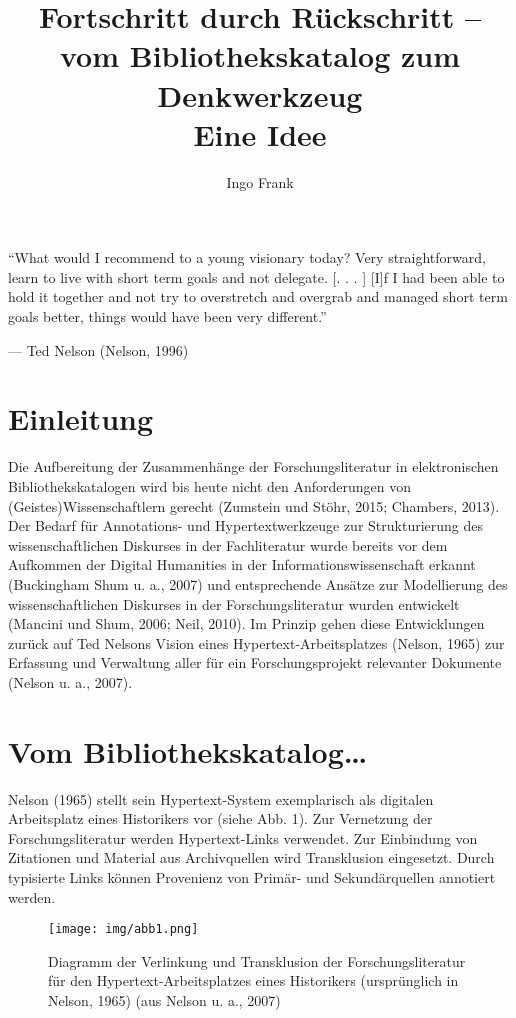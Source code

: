 \documentclass[a4paper,
fontsize=11pt,
oneside,
numbers=noperiodatend,
parskip=half-,
bibliography=totoc,
final
]{scrartcl}
\title{\LARGE{Fortschritt durch Rückschritt -- vom Bibliothekskatalog zum Denkwerkzeug \\ Eine Idee}} %
\author{Ingo Frank} %
\date{}
\begin{document}
\maketitle
\thispagestyle{fancyplain} 


\enquote{What would I recommend to a young visionary today? Very
straightforward, learn to live with short term goals and not delegate.
{[}. . . {]} {[}I{]}f I had been able to hold it together and not try to
overstretch and overgrab and managed short term goals better, things
would have been very different.}

--- Ted Nelson (Nelson, 1996)

\section*{Einleitung}\label{einleitung}

Die Aufbereitung der Zusammenhänge der Forschungsliteratur in
elektronischen Bibliothekskatalogen wird bis heute nicht den
Anforderungen von (Geistes)Wissenschaftlern gerecht (Zumstein und Stöhr,
2015; Chambers, 2013). Der Bedarf für Annotations- und
Hypertextwerkzeuge zur Strukturierung des wissenschaftlichen Diskurses
in der Fachliteratur wurde bereits vor dem Aufkommen der Digital
Humanities in der Informationswissenschaft erkannt (Buckingham Shum u.
a., 2007) und entsprechende Ansätze zur Modellierung des
wissenschaftlichen Diskurses in der Forschungsliteratur wurden
entwickelt (Mancini und Shum, 2006; Neil, 2010). Im Prinzip gehen diese
Entwicklungen zurück auf Ted Nelsons Vision eines
Hypertext-Ar\-beits\-platz\-es (Nelson, 1965) zur Erfassung und Verwaltung
aller für ein Forschungsprojekt relevanter Dokumente (Nelson u. a.,
2007).

\section*{Vom
Bibliothekskatalog\ldots{}}\label{vom-bibliothekskatalog}

Nelson (1965) stellt sein Hypertext-System exemplarisch als digitalen
Arbeitsplatz eines Historikers vor (siehe Abb. 1). Zur Vernetzung der
Forschungsliteratur werden Hypertext-Links verwendet. Zur Einbindung von
Zitationen und Material aus Archivquellen wird Transklusion eingesetzt.
Durch typisierte Links können Provenienz von Primär- und Sekundärquellen
annotiert werden.

\begin{figure}
\centering
\texttt{[image: img/abb1.png]}
\caption{Diagramm der Verlinkung und Transklusion der
Forschungsliteratur für den Hypertext-Arbeitsplatzes eines Historikers
(ursprünglich in Nelson, 1965) (aus Nelson u. a., 2007)}
\end{figure}
\end{document}
